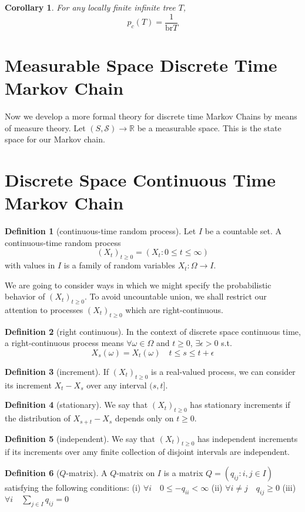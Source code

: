\documentclass{article}
\newtheorem{Cor}{Corollary}[Thm]
\theoremstyle{definition}
\newtheorem{Def}{Definition}[section]
\renewcommand{\leq}{\leqslant}
\renewcommand{\geq}{\geqslant}
\newcommand{\<}{\left\langle}
\renewcommand{\>}{\right\rangle}
\begin{document}
\begin{Cor}
    For any locally finite infinite tree $T$, 
    \[p_c(T)=\frac{1}{\text{br}T}\]
\end{Cor}

\section{Measurable Space Discrete Time Markov Chain}
Now we develop a more formal theory for discrete time Markov Chains by means of measure theory.
Let $(S,\mathcal{S})\to\mathbb{R}$ be a measurable space. This is the state space for our Markov chain.


\section{Discrete Space Continuous Time Markov Chain}

\begin{Def}[continuous-time random process]
    Let $I$ be a countable set. A continuous-time random process \[(X_t)_{t\geq 0}=(X_t:0\leq t\leq\infty)\] 
    with values in $I$ is a family of random variables $X_t:\Omega\to I$.
\end{Def}
We are going to consider ways in which we might specify the probabilistic behavior of $(X_t)_{t\geq 0}$.
To avoid uncountable union, we shall restrict our attention to processes $(X_t)_{t\geq 0}$ which are right-continuous.
\begin{Def}[right continuous]
    In the context of discrete space continuous time, a right-continuous process means $\forall \omega\in\Omega$
    and $t\geq 0$, $\exists \epsilon>0$ s.t. \[X_s(\omega)=X_t(\omega)\quad t\leq s\leq t+\epsilon\]
\end{Def}
\begin{Def}[increment]
    If $(X_t)_{t\geq 0}$ is a real-valued process, we can consider its increment $X_t-X_s$ over any interval $(s,t]$.
\end{Def}
\begin{Def}[stationary]
    We say that $(X_t)_{t\geq 0}$ has stationary increments if the distribution of $X_{s+t}-X_s$ depends only on $t\geq 0$.
\end{Def}
\begin{Def}[independent]
    We say that $(X_t)_{t\geq 0}$ has independent increments if its increments over amy finite collection of disjoint intervals are independent.
\end{Def}
\begin{Def}[$Q$-matrix]
    A $Q$-matrix on $I$ is a matrix $Q=(q_{ij}:i,j\in I)$ satisfying the following conditions:\newline
(i) $\forall i\quad 0\leq -q_{ii}<\infty$ \newline 
(ii) $\forall i\ne j\quad q_{ij}\geq 0$\newline 
(iii) $\forall i\quad \sum_{j\in I}q_{ij}=0$
\end{Def}
\end{document}
